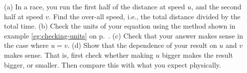 (a) In a race, you run the first half of the distance at speed $u$,
and the second half at speed $v$. Find the over-all speed, i.e.,
the total distance divided by the total time.\answercheck\hwendpart
%
(b) Check the units of your equation using the method shown in example \ref{eg:checking-units}
on p.~\pageref{eg:checking-units}.\hwendpart
%
(c) Check that your answer makes sense in the case where $u=v$.\hwendpart
%
(d) Show that the dependence of your result on $u$ and $v$ makes sense. That is, first
check whether making $u$ bigger makes the result bigger, or smaller. Then compare this
with what you expect physically.
